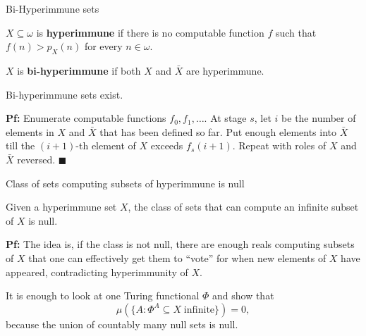\begin{frame}{Bi-Hyperimmune sets}
  \begin{define}
    $X\subseteq\omega$ is \textbf{hyperimmune} if there is no computable
    function $f$ such that $f(n)>p_X(n)$ for every $n\in\omega$.
  \end{define}

  \begin{define}
    $X$ is \textbf{bi-hyperimmune} if both $X$ and $\bar{X}$ are hyperimmune.
  \end{define}

  \begin{thm}
    Bi-hyperimmune sets exist.
  \end{thm}

  \vspace{0.5em}
  \textbf{Pf:} Enumerate computable functions $f_0,f_1,\ldots$. At stage
  $s$, let $i$ be the number of elements in $X$ and $\bar{X}$ that has been
  defined so far. Put enough elements into $\bar{X}$ till the $(i+1)$-th
  element of $X$ exceeds $f_s(i+1)$. Repeat with roles of $X$ and $\bar{X}$
  reversed. $\blacksquare$
\end{frame}

\begin{frame}{Class of sets computing subsets of hyperimmune is null}
  \begin{thm}
    \label{thm:bihyper-null}
    Given a hyperimmune set $X$, the class of sets that can compute an
    infinite subset of $X$ is null.
  \end{thm}

  \vspace{1em}
  \textbf{Pf:} The idea is, if the class is not null, there are enough
  reals computing subsets of $X$ that one can effectively get them to
  ``vote'' for when new elements of $X$ have appeared, contradicting
  hyperimmunity of $X$.

  \vspace{1em}
  It is enough to look at one Turing functional $\Phi$ and show that
  \[\mu(\{A: \Phi^A \subseteq X\; \text{infinite}\}) =0,\]
  because the union of countably many null sets is null.
\end{frame}

